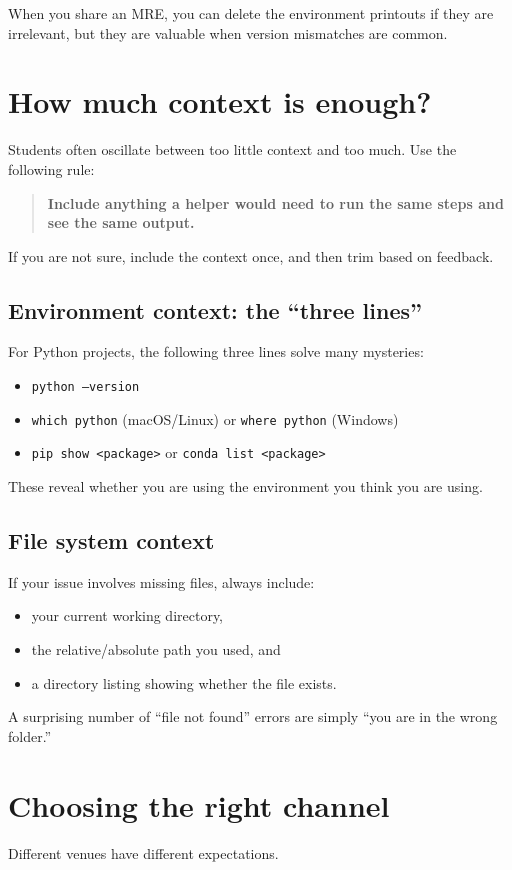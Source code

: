 When you share an MRE, you can delete the environment printouts if they are irrelevant, but they are valuable when version mismatches are common.

\section{How much context is enough?}
Students often oscillate between too little context and too much. Use the following rule:

\begin{quote}
\textbf{Include anything a helper would need to run the same steps and see the same output.}
\end{quote}

If you are not sure, include the context once, and then trim based on feedback.

\subsection{Environment context: the ``three lines''}
For Python projects, the following three lines solve many mysteries:
\begin{itemize}[noitemsep]
  \item \texttt{python --version}
  \item \texttt{which python} (macOS/Linux) or \texttt{where python} (Windows)
  \item \texttt{pip show <package>} or \texttt{conda list <package>}
\end{itemize}

These reveal whether you are using the environment you think you are using.

\subsection{File system context}
If your issue involves missing files, always include:
\begin{itemize}[noitemsep]
  \item your current working directory,
  \item the relative/absolute path you used, and
  \item a directory listing showing whether the file exists.
\end{itemize}

A surprising number of ``file not found'' errors are simply ``you are in the wrong folder.''

\section{Choosing the right channel}
Different venues have different expectations.

